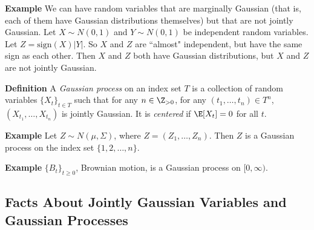 \textbf{Example} We can have random variables that are marginally Gaussian (that is, each of them have Gaussian distributions themselves) but that are not jointly Gaussian.  Let $X\sim N(0,1)$ and $Y\sim N(0,1)$ be independent random variables.  Let $Z=\mathrm{sign}(X)|Y|$.  So $X$ and $Z$ are ``almost" independent, but have the same sign as each other.  Then $X$ and $Z$ both have Gaussian distributions, but $X$ and $Z$ are not jointly Gaussian.

\textbf{Definition} A \emph{Gaussian process} on an index set $T$ is a collection of random variables $\{X_t\}_{t\in T}$ such that for any $n\in\Z_{>0}$, for any $(t_1,\dots,t_n)\in T^n$, $(X_{t_1},\dots,X_{t_n})$ is jointly Gaussian.  It is \emph{centered} if $\E[X_t]=0$ for all $t$.

\textbf{Example} Let $Z\sim N(\mu, \Sigma)$, where $Z=(Z_1,\dots,Z_n)$.  Then $Z$ is a Gaussian process on the index set $\{1,2,\dots,n\}$.

\textbf{Example} $\{B_t\}_{t\geq 0}$, Brownian motion, is a Gaussian process on $[0,\infty)$.

\subsection{Facts About Jointly Gaussian Variables and Gaussian Processes}

